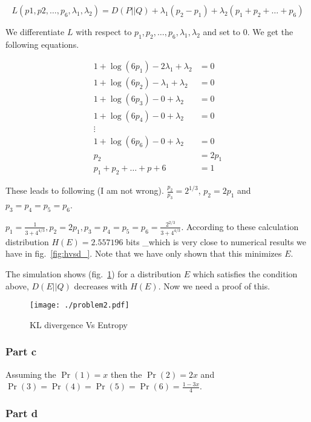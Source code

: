 \documentclass[]{article}
\begin{document}
\[L(p1,p2,\ldots,p_6,\lambda_1,\lambda_2) = D(P||Q) + \lambda_1(p_2-p_1) + 
\lambda_2(p_1+p_2+\ldots+p_6)\]

We differentiate \(L\) with respect to
\(p_1,p_2,\ldots,p_6,\lambda_1,\lambda_2\) and set to 0. We get the
following equations.

\[
\begin{aligned}
1 + \log( 6p_1 ) - 2 \lambda_1 + \lambda_2 &= 0 \\
1 + \log( 6p_2 ) - \lambda_1 + \lambda_2 &= 0 \\
1 + \log( 6p_3 ) - 0 + \lambda_2 &= 0 \\
1 + \log( 6p_4 ) - 0 + \lambda_2 &= 0 \\
\vdots \\
1 + \log( 6p_6 ) - 0 + \lambda_2 &= 0 \\
p_2 &= 2 p_1 \\
p_1 + p_2 + \dots + p+6 &= 1 
\end{aligned}
\]

These leads to following (I am not wrong).
\(\frac{p_2}{p_3} = 2^{1/3}\), \(p_2=2p_1\) and \(p_3=p_4=p_5=p_6\).

\(p_1=\frac{1}{3 + 4^{4/3}}, p_2=2p_1,p_3=p_4=p_5=p_6=\frac{2^{2/3}}{3+4^{4/3}}\).
According to these calculation distribution \(H(E)=2.557196\) bits
\_which is very close to numerical results we have in
fig.~\ref{fig:hvsd_}. Note that we have only shown that this minimizes
\(E\). 

The simulation shows (fig.~\ref{fig:hvsd}) for a distribution \(E\)
which satisfies the condition above, \(D(E||Q)\) decreases with
\(H(E)\). Now we need a proof of this.

\begin{figure}[htbp]
\centering
\texttt{[image: ./problem2.pdf]}
\caption{KL divergence Vs Entropy}\label{fig:hvsd}
\end{figure}

\subsubsection{Part c}\label{part-c}

Assuming the \(\Pr(1)=x\) then the \(\Pr(2)=2x\) and
\(\Pr(3)=\Pr(4)=\Pr(5)=\Pr(6)=\frac{1-3x}{4}\).


\subsubsection{Part d}\label{part-d}
\end{document}
